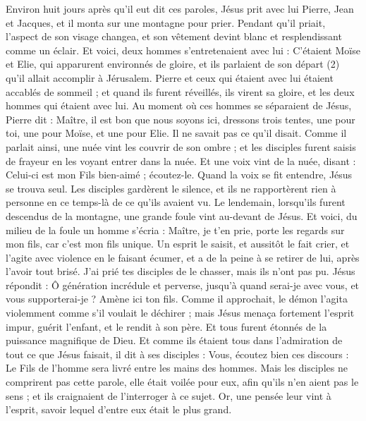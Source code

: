 \begin{multicols}{2}
Environ huit jours après qu’il eut dit ces paroles, Jésus prit avec lui Pierre, Jean et Jacques, et il monta sur une montagne pour prier.
Pendant qu’il priait, l’aspect de son visage changea, et son vêtement devint blanc et resplendissant comme un éclair.
Et voici, deux hommes s’entretenaient avec lui : C’étaient Moïse et Elie,
qui apparurent environnés de gloire, et ils parlaient de son départ (2) qu'il allait accomplir à Jérusalem.
Pierre et ceux qui étaient avec lui étaient accablés de sommeil ; et quand ils furent réveillés, ils virent sa gloire, et les deux hommes qui étaient avec lui.
Au moment où ces hommes se séparaient de Jésus, Pierre dit : Maître, il est bon que nous soyons ici, dressons trois tentes, une pour toi, une pour Moïse, et une pour Elie. Il ne savait pas ce qu'il disait.
Comme il parlait ainsi, une nuée vint les couvrir de son ombre ; et les disciples furent saisis de frayeur en les voyant entrer dans la nuée.
Et une voix vint de la nuée, disant : Celui-ci est mon Fils bien-aimé ; écoutez-le.
Quand la voix se fit entendre, Jésus se trouva seul. Les disciples gardèrent le silence, et ils ne rapportèrent rien à personne en ce temps-là de ce qu'ils avaient vu.
Le lendemain, lorsqu’ils furent descendus de la montagne, une grande foule vint au-devant de Jésus.
Et voici, du milieu de la foule un homme s'écria : Maître, je t’en prie, porte les regards sur mon fils, car c’est mon fils unique.
Un esprit le saisit, et aussitôt le fait crier, et l'agite avec violence en le faisant écumer, et a de la peine à se retirer de lui, après l'avoir tout brisé.
J’ai prié tes disciples de le chasser, mais ils n'ont pas pu.
Jésus répondit : Ô génération incrédule et perverse, jusqu’à quand serai-je avec vous, et vous supporterai-je ? Amène ici ton fils.
Comme il approchait, le démon l'agita violemment comme s'il voulait le déchirer ; mais Jésus menaça fortement l'esprit impur, guérit l'enfant, et le rendit à son père.
Et tous furent étonnés de la puissance magnifique de Dieu. Et comme ils étaient tous dans l’admiration de tout ce que Jésus faisait, il dit à ses disciples :
Vous, écoutez bien ces discours : Le Fils de l'homme sera livré entre les mains des hommes.
Mais les disciples ne comprirent pas cette parole, elle était voilée pour eux, afin qu’ils n’en aient pas le sens ; et ils craignaient de l'interroger à ce sujet.
\TextTitle{[grandeur]}
Or, une pensée leur vint à l’esprit, savoir lequel d'entre eux était le plus grand.

\end{multicols}
